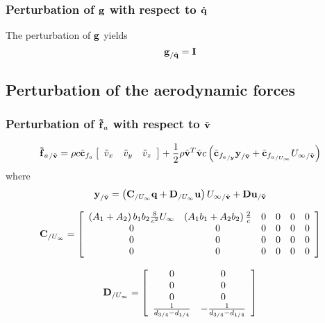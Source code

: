 \subsubsection{Perturbation of $\bm{\mathbf{g}}$ with respect to $\bm{\mathbf{\dot{q}}}$}
The perturbation of $\bm{\mathbf{g}}$ yields
\begin{equation}
\bm{\mathbf{g}}_{/{\bm{\mathbf{\dot{q}}}}} = \bm{\mathbf{I}}
\end{equation}

\subsection{Perturbation of the aerodynamic forces}

\subsubsection{Perturbation of $\bm{\mathbf{\tilde{f}}}_a$ with respect to $\tilde{\bm{\mathbf{v}}}$}


\begin{equation}
{\bm{\mathbf{\tilde{f}}}_a}_{/\tilde{\bm{\mathbf{v}}}} = 
	\rho c \tilde{\bm{\mathbf{c}}}_{f_{a}} \left[
		\begin{array}{ccc}
			\tilde{v}_x & \tilde{v}_y & \tilde{v}_z
		\end{array} \right] +
	\frac{1}{2} \rho \tilde{\bm{\mathbf{v}}}^T \tilde{\bm{\mathbf{v}}} c
	\left(  \tilde{\bm{\mathbf{c}}}_{{f_{a}}_{/\bm{\mathbf{y}}}} \bm{\mathbf{y}}_{/\tilde{\bm{\mathbf{v}}}} + 
	\tilde{\bm{\mathbf{c}}}_{{f_{a}}_{/U_{\infty}}} {U_\infty}_{/\tilde{\bm{\mathbf{v}}}}  \right) 
\end{equation}
where
\begin{equation}
\bm{\mathbf{y}}_{/\tilde{\bm{\mathbf{v}}}} = \left( 
	\bm{\mathbf{C}}_{/U_{\infty}} \bm{\mathbf{q}} + \bm{\mathbf{D}}_{/U_{\infty}} \bm{\mathbf{u}} \right) {U_\infty}_{/\tilde{\bm{\mathbf{v}}}}
	+ \bm{\mathbf{D}} \bm{\mathbf{u}}_{/\tilde{\bm{\mathbf{v}}}}
\end{equation}


\begin{equation}
\bm{\mathbf{C}}_{/U_\infty} = \left[
	\begin{array}{cccccc}
	\left(  A_1 + A_2 \right) b_1 b_2 \frac{8}{c^2} U_\infty & \left(  A_1 b_1 + A_2 b_2 \right) \frac{2}{c} & 0 & 0 & 0 & 0\\
	0 & 0 & 0 & 0 & 0 & 0\\
	0 & 0 & 0 & 0 & 0 & 0\\
	0 & 0 & 0 & 0 & 0 & 0\\
	\end{array}
	\right]
\end{equation}

\begin{equation}
\bm{\mathbf{D}}_{/U_\infty} = \left[
	\begin{array}{cc}
	0 & 0 \\
	0 & 0 \\
	0 & 0 \\
	\frac{1}{d_{3/4} - d_{1/4}} & 	-\frac{1}{d_{3/4} - d_{1/4}} \\
	\end{array}
	\right]
\end{equation}

